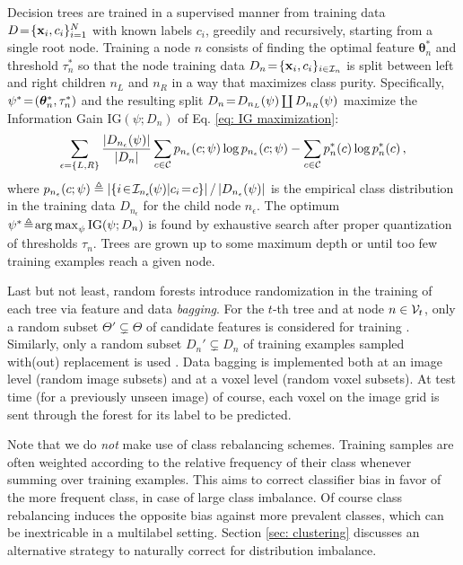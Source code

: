 Decision trees are trained in a supervised manner from training data $D\!=\!\{\boldsymbol{\mathrm{x}}_i,c_i\}_{i=1}^N$ with known labels $c_i$, greedily and recursively, starting from a single root node. Training a node $n$ consists of finding the optimal feature $\bm{\theta}_n^\ast$ and threshold $\tau_n^\ast$ so that the node training data $D_n\!=\!\{\boldsymbol{\mathrm{x}}_i,c_i\}_{i\in\mathcal{I}_n}$ is split between left and right children $n_L$ and $n_R$ in a way that maximizes class purity. Specifically, $\psi^\ast\!=\!(\bm{\theta}_n^\ast, \tau_n^\ast)$ and the resulting split $D_n\!=\! D_{n_L}(\psi)\coprod D_{n_R}(\psi)$ maximize the Information Gain $\text{IG}(\psi; D_n)$ of Eq. \eqref{eq: IG maximization}:
\begin{equation}
\sum_{\epsilon=\{L,R\}} \frac{\vert D_{n_\epsilon}(\psi)\vert}{\vert D_n\vert}\sum_{c\in\mathcal{C}}p_{n_\epsilon}(c;\psi)\log{p_{n_\epsilon}(c;\psi)} \\ 
 -\sum_{c\in\mathcal{C}}p_{n}^\ast(c)\log{p_{n}^\ast(c)}\, ,
\label{eq: IG maximization}
\end{equation}
where $p_{n_\epsilon}(c;\psi)\triangleq\left\vert\{i\!\in\!\mathcal{I}_{n_\epsilon}\!(\psi)\vert c_i\!=\! c\}\right\vert/\left\vert D_{n_\epsilon}(\psi)\right\vert$ is the empirical class distribution in the training data $D_{n_\epsilon}$ for the child node $n_\epsilon$. The optimum $\psi^\ast\!\triangleq\! \operatorname*{arg\,max}_{\psi}\text{IG}(\psi; D_n)$ is found by exhaustive search after proper quantization of thresholds $\tau_n$. Trees are grown up to some maximum depth or until too few training examples reach a given node.

Last but not least, random forests introduce randomization in the training of each tree via feature and data \textit{bagging}. For the $t$-th tree and at node $n\in\mathcal{V}_t$, only a random subset $\Theta' \!\varsubsetneq\! \Theta$ of candidate features is considered for training \cite{amit1997shape,ho1998random}. %
Similarly, only a random subset $D_n'\!\varsubsetneq\!D_n$ of training examples sampled with(out) replacement is used \cite{breiman1996bagging}. %
Data bagging is implemented both at an image level (random image subsets) and at a voxel level (random voxel subsets). At test time (for a previously unseen image) of course, each voxel on the image grid is sent through the forest for its label to be predicted. 

Note that we do \textit{not} make use of class rebalancing schemes. Training samples are often weighted according to the relative frequency of their class whenever summing over training examples. This aims to correct classifier bias in favor of the more frequent class, in case of large class imbalance. Of course class rebalancing induces the opposite bias against more prevalent classes, which can be inextricable in a multilabel setting. Section \ref{sec: clustering} discusses an alternative strategy to naturally correct for distribution imbalance.